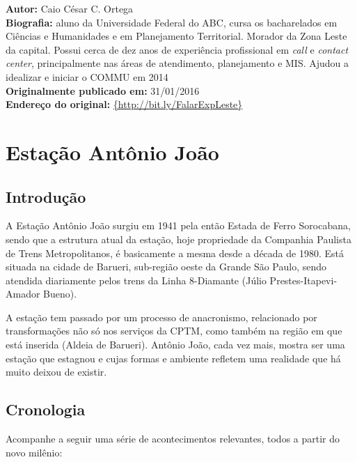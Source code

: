 \documentclass[11pt,fleqn]{book} %
\newcommand{\infocaio}[2]{\textbf{Autor:} Caio C\'{e}sar C. Ortega \\ \textbf{Biografia:} aluno da Universidade Federal do ABC, cursa os bacharelados em Ci\^{e}ncias e Humanidades e em Planejamento Territorial. Morador da Zona Leste da capital. Possui cerca de dez anos de experi\^{e}ncia profissional em \textit{call} e \textit{contact center}, principalmente nas \'{a}reas de atendimento, planejamento e MIS. Ajudou a idealizar e iniciar o COMMU em 2014 \\ \textbf{Originalmente publicado em:} {#1} \\ \textbf{Endere\c{c}o do original:} \url{{#2}}}
\begin{document}
\begin{info}
	\infocaio{31/01/2016}{http://bit.ly/FalarExpLeste}
\end{info}

\section{Estação Antônio João}

\subsection{Introdução}

A Estação Antônio João surgiu em 1941 pela então Estada de Ferro Sorocabana, sendo que a estrutura atual da estação, hoje propriedade da Companhia Paulista de Trens Metropolitanos, é basicamente a mesma desde a década de 1980. Está situada na cidade de Barueri, sub-região oeste da Grande São Paulo, sendo atendida diariamente pelos trens da Linha 8-Diamante (Júlio Prestes-Itapevi-Amador Bueno).

A estação tem passado por um processo de anacronismo, relacionado por transformações não só nos serviços da CPTM, como também na região em que está inserida (Aldeia de Barueri). Antônio João, cada vez mais, mostra ser uma estação que estagnou e cujas formas e ambiente refletem uma realidade que há muito deixou de existir.

\subsection{Cronologia}

Acompanhe a seguir uma série de acontecimentos relevantes, todos a partir do novo milênio:
\end{document}
